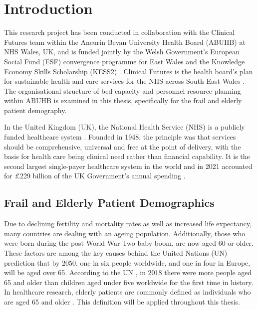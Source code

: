 \documentclass[../thesis.tex]{subfiles}
\begin{document}
\chapter{Introduction}\label{chp:Introduction}

This research project has been conducted in collaboration with the Clinical Futures team within the Aneurin Bevan University Health Board (ABUHB) \cite{UniAneurinBevanHealthBoard} at NHS Wales, UK, and is funded jointly by the Welsh Government's European Social Fund (ESF) convergence programme for East Wales and the Knowledge Economy Skills Scholarship (KESS2) \cite{KESS2023}. Clinical Futures is the health board's plan for sustainable health and care services for the NHS across South East Wales \cite{UniAneurinBevanHealthBoardc}. The organisational structure of bed capacity and personnel resource planning within ABUHB is examined in this thesis, specifically for the frail and elderly patient demography.

In the United Kingdom (UK), the National Health Service (NHS) is a publicly funded healthcare system \cite{Welch2018}. Founded in 1948, the principle was that services should be comprehensive, universal and free at the point of delivery, with the basis for health care being clinical need rather than financial capability. It is the second largest single-payer healthcare system in the world and in 2021 accounted for $\pounds$229 billion of the UK Government's annual spending \cite{ONS2022a}.


\section{Frail and Elderly Patient Demographics}\label{sec:elderlyfrail}
Due to declining fertility and mortality rates as well as increased life expectancy, many countries are dealing with an ageing population. Additionally, those who were born during the post World War Two baby boom, are now aged 60 or older. These factors are among the key causes behind the United Nations 
(UN) prediction that by 2050, one in six people worldwide, and one in four in Europe, will be aged over 65. According to the UN \cite{UN3}, in 2018 there were more people aged 65 and older than children aged under five worldwide for the first time in history. In healthcare research, elderly patients are commonly defined as individuals who are aged 65 and older \cite{Crews2006,GOV.UK2001,NHSEngland,Orimo2006}. This definition will be applied throughout this thesis. 
\end{document}
